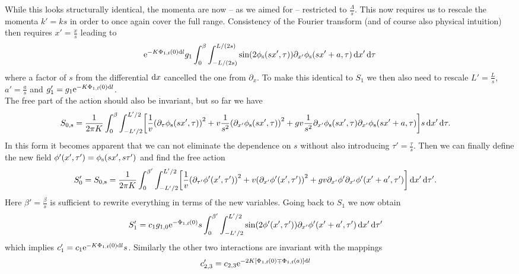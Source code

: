 \documentclass[english, parskip=full]{scrartcl}
\begin{document}
While this looks structurally identical, the momenta are now -- as we aimed for -- restricted to $\frac{\Lambda}{s}$.
This now requires us to rescale the momenta $k'=ks$ in order to once again cover the full range.
Consistency of the Fourier transform (and of course also physical intuition) then requires $x'=\frac{x}{s}$ leading to
\begin{align}
\powe{-K \Phi_{1,\f}(0) \d l} g_1 \intx{0}{\beta}{\intx{-L/(2s)}{L/(2s)}{ \sin\kla*{2\phi_\s(sx',\tau)} \partial_{x'}\phi_\s(sx'+a,\tau) }{x'}}{\tau}
\end{align}
where a factor of $s$ from the differential $\d x$ cancelled the one from $\partial_x$.
To make this identical to $S_1$ we then also need to rescale $L' = \frac{L}{s}$, $a'=\frac{a}{s}$ and $g_1' = g_1 \powe{-K\Phi_{1,\f}(0)\d l}$.\\
The free part of the action should also be invariant, but so far we have
\begin{align}
S_{0,\s} &= \frac{1}{2\pi K} \intx{0}{\beta}{\intx{-L'/2}{L'/2}{\klb*{\frac{1}{v} \kla*{\partial_\tau\phi_\s(sx',\tau)}^2 + v \frac{1}{s^2}\kla*{\partial_{x'}\phi_\s(sx',\tau)}^2 + gv \frac{1}{s^2} \partial_{x'}\phi_\s(sx',\tau) \partial_{x'}\phi_\s(sx'+a,\tau) } s}{x'}}{\tau}.
\end{align}
In this form it becomes apparent that we can not eliminate the dependence on $s$ without also introducing $\tau'=\frac{\tau}{s}$.
Then we can finally define the new field $\phi'(x',\tau') = \phi_\s(sx',s\tau')$ and find the free action
\begin{align}
S_0' &= S_{0,\s} = \frac{1}{2\pi K} \intx{0}{\beta'}{\intx{-L'/2}{L'/2}{\klb*{\frac{1}{v} \kla*{\partial_{\tau'} \phi'(x',\tau')}^2 + v \kla*{\partial_{x'} \phi'(x',\tau')}^2 + gv \partial_{x'}\phi' \partial_{x'}\phi'(x'+a',\tau')}}{x'}}{\tau'}.
\end{align}
Here $\beta'= \frac{\beta}{s}$ is sufficient to rewrite everything in terms of the new variables.
Going back to $S_1$ we now obtain
\begin{align}
S_1' &= c_1 g_{1,0} \powe{-\Phi_{1,\f}(0)} s \intx{0}{\beta'}{\intx{-L'/2}{L'/2}{\sin\kla*{2\phi'(x',\tau')} \partial_{x'} \phi'(x'+a',\tau')}{x'}}{\tau'}
\end{align}
which implies $c_1' = c_1 \powe{-K\Phi_{1,\f}(0) \d l} s$.
Similarly the other two interactions are invariant with the mappings
\begin{align}
c_{2,3}' &= c_{2,3} \powe{-2K\klb*{\Phi_{1,\f}(0) \mp \Phi_{1,\f}(a)} \d l}
\end{align}
\end{document}
